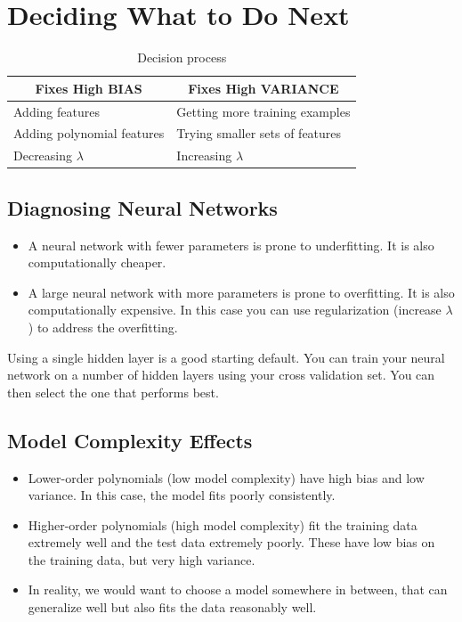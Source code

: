 \pagebreak

\section{Deciding What to Do Next}

\begin{table}[h!]
	\caption{Decision process}
	\centering
	\begin{tabular}{|l|l|}
		\hline
		\multicolumn{1}{|c|}{\textbf{Fixes High BIAS}} & \multicolumn{1}{c|}{\textbf{Fixes High VARIANCE}} \\ \hline
		Adding features                                & Getting more training examples                    \\
		Adding polynomial features                     & Trying smaller sets of features                   \\
		Decreasing $\lambda$                           & Increasing $\lambda$                              \\ \hline
	\end{tabular}
\end{table}

\subsection{Diagnosing Neural Networks}

\begin{itemize}
\item A neural network with fewer parameters is prone to underfitting. It is also computationally cheaper.
\item A large neural network with more parameters is prone to overfitting. It is also computationally expensive. In this case you can use regularization (increase $\lambda$) to address the overfitting.
\end{itemize}

Using a single hidden layer is a good starting default. You can train your neural network on a number of hidden layers using your cross validation set. You can then select the one that performs best.

\subsection{Model Complexity Effects}

\begin{itemize}
\item Lower-order polynomials (low model complexity) have high bias and low variance. In this case, the model fits poorly consistently.
\item Higher-order polynomials (high model complexity) fit the training data extremely well and the test data extremely poorly. These have low bias on the training data, but very high variance.
\item In reality, we would want to choose a model somewhere in between, that can generalize well but also fits the data reasonably well.
\end{itemize}